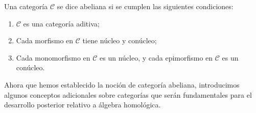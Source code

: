 \begin{definicion} 
   Una categoría $\mathscr{C}$ se dice abeliana si se cumplen las siguientes condiciones:

    \begin{enumerate}
        \item $\mathscr{C}$ es una categoría aditiva;
        \item Cada morfismo en $\mathscr{C}$ tiene núcleo y conúcleo;
        \item Cada monomorfismo en $\mathscr{C}$ es un núcleo, y cada epimorfismo en $\mathscr{C}$ es un conúcleo.
    \end{enumerate}
\end{definicion}

Ahora que hemos establecido la noción de categoría abeliana, introducimos algunos conceptos adicionales sobre categorías que serán fundamentales para el desarrollo posterior relativo a álgebra homológica. 

